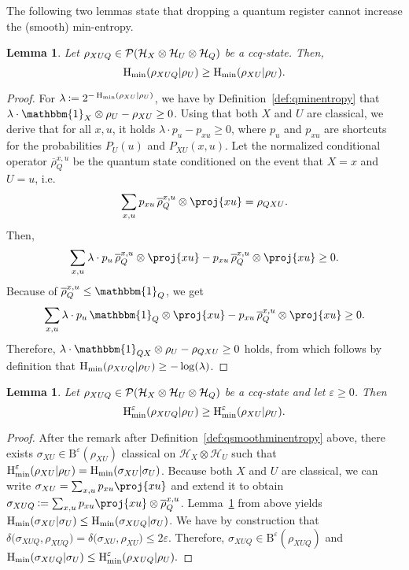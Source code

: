 \documentclass[final,11pt,a4paper]{report}
\newtheorem{lemma}[theorem]{Lemma}
\newcommand*{\assign}{\ensuremath{\kern.5ex\raisebox{.1ex}{\mbox{\rm:}}\kern -.3em =}}
\newcommand*{\ol}[1]{\overline{#1}}
\renewcommand*{\id}{\mathbbm{1}}   %
\newcommand*{\cH}{\mathcal{H}}
\newcommand*{\ball}[1]{{\mathrm{B}}^{#1}}  %
\newcommand*{\dens}[1]{\mathcal{P}(#1)}  %
\renewcommand*{\H}{\operatorname{H}}   %
\newcommand*{\qhmin}{\ensuremath{\H_{\rm min}}}  %
\newcommand*{\hminee}{\qhmin^{\varepsilon}} %
\newcommand*{\dist}[1]{\delta\big(#1\big)}  %
\begin{document}
The following two lemmas state that dropping a quantum register
cannot increase the (smooth) min-entropy.
\begin{lemma} \label{lem:dropquantum_notsmooth}
Let $\rho_{XUQ} \in \dens{\cH_X \otimes \cH_U \otimes {\cal
    H}_Q}$ be a ccq-state. Then,
$$\qhmin(\rho_{XUQ} | \rho_U) \geq \qhmin(\rho_{XU} | \rho_U).$$
\end{lemma}
\begin{proof}
For $\lambda \assign 2^{-\qhmin(\rho_{XU} | \rho_U)}$, we have
by Definition~\ref{def:qminentropy} that $\lambda \cdot \id_X
\otimes \rho_U - \rho_{XU} \geq 0$. Using that both $X$ and $U$ are
classical, we derive that for all $x,u$, it holds $\lambda \cdot p_u -
p_{xu} \geq 0$, where $p_u$ and $p_{xu}$ are shortcuts for the
probabilities $P_U(u)$ and $P_{XU}(x,u)$.
Let the normalized conditional operator $\ol{\rho}_Q^{x,u}$ be the
quantum state conditioned on the event that $X=x$ and $U=u$,
i.e.
\[\sum_{x,u} p_{xu} \, \ol{\rho}_Q^{x,u} \otimes \proj{xu}= \rho_{QXU}.\]
Then,
\[\sum_{x,u} \lambda \cdot p_u \, \ol{\rho}_Q^{x,u} \otimes \proj{xu}
- p_{xu} \, \ol{\rho}_Q^{x,u} \otimes \proj{xu} \geq 0.\]
Because of $\ol{\rho}_Q^{x,u} \leq \id_Q$, we get
\[\sum_{x,u} \lambda \cdot p_u \, \id_Q  \otimes \proj{xu} - p_{xu} \,
\ol{\rho}_Q^{x,u} \otimes \proj{xu} \geq 0.\]
Therefore, $\lambda \cdot \id_{QX} \otimes \rho_U - \rho_{QXU} \geq 0$
holds, from which follows by definition that $\qhmin(\rho_{XUQ} | \rho_U) \geq
-\log(\lambda)$.
\end{proof}

\begin{lemma} \label{lem:dropquantum}
  Let $\rho_{XUQ} \in \dens{\cH_X \otimes \cH_U \otimes {\cal H}_Q}$
  be a ccq-state and let $\varepsilon \geq 0$. Then
$$\hminee(\rho_{XUQ} | \rho_U) \geq \hminee(\rho_{XU} | \rho_U).$$
\end{lemma}
\begin{proof}
  After the remark after Definition~\ref{def:qsmoothminentropy} above,
  there exists $\sigma_{XU} \in \ball{\varepsilon}(\rho_{XU})$
  classical on $\cH_X \otimes \cH_U$ such that $\hminee(\rho_{XU} |
  \rho_U) = \qhmin(\sigma_{XU} | \sigma_U)$. Because both $X$
  and $U$ are classical, we can write $\sigma_{XU} = \sum_{x,u} p_{xu}
  \proj{xu}$ and extend it to obtain $\sigma_{XUQ} \assign \sum_{x,u}
  p_{xu} \proj{xu} \otimes \ol{\rho}_Q^{x,u}$.
  Lemma~\ref{lem:dropquantum_notsmooth} from above yields $\H_{\rm
    min}(\sigma_{XU} | \sigma_U) \leq \qhmin(\sigma_{XUQ}
  | \sigma_U)$.  We have by construction that $\dist{ \sigma_{XUQ},
  \rho_{XUQ} } = \dist{ \sigma_{XU},\rho_{XU} } \leq 2 \varepsilon$.
  Therefore, $\sigma_{XUQ} \in \ball{\varepsilon}(\rho_{XUQ})$ and
  $\qhmin(\sigma_{XUQ} | \sigma_U) \leq \hminee(\rho_{XUQ}
  | \rho_U).$
\end{proof}
\end{document}
